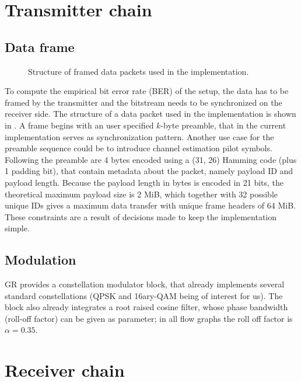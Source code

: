 \section{Transmitter chain}

\subsection{Data frame} \label{sec:data-frame}

\begin{figure}
\centering

	\caption{
		Structure of framed data packets used in the implementation.
		\label{fig:dataframe}
	}
\end{figure}

To compute the empirical bit error rate (BER) of the setup, the data has to be framed by the transmitter and the bitstream needs to be synchronized on the receiver side. The structure of a data packet used in the implementation is shown in . A frame begins with an user specified \(k\)-byte preamble, that in the current implementation serves as synchronization pattern. Another use case for the preamble sequence could be to introduce channel estimation pilot symbols. Following the preamble are 4 bytes encoded using a (31, 26) Hamming code (plus 1 padding bit), that contain metadata about the packet, namely payload ID and payload length. Because the payload length in bytes is encoded in 21 bits, the theoretical maximum payload size is 2 MiB, which together with 32 possible unique IDs gives a maximum data transfer with unique frame headers of 64 MiB. These constraints are a result of decisions made to keep the implementation simple. %


\subsection{Modulation}

GR provides a constellation modulator block, that already implements several standard constellations (QPSK and 16ary-QAM being of interest for us). The block also already integrates a root raised cosine filter, whose phase bandwidth (roll-off factor) can be given as parameter; in all flow graphs the roll off factor is \(\alpha = 0.35\).

\section{Receiver chain}

